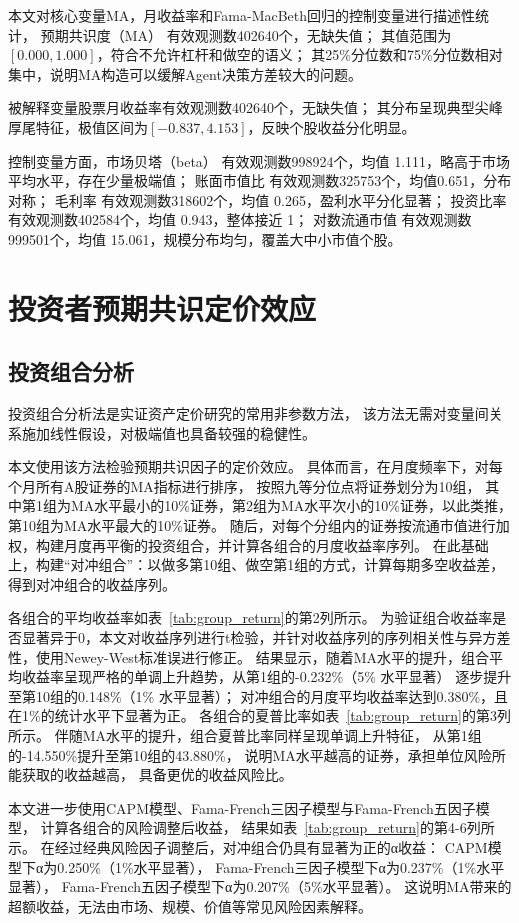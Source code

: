 本文对核心变量MA，月收益率和Fama-MacBeth回归的控制变量进行描述性统计，
预期共识度（MA） 有效观测数402640个，无缺失值；
其值范围为$[0.000, 1.000]$，符合不允许杠杆和做空的语义；
其25\%分位数和75\%分位数相对集中，说明MA构造可以缓解Agent决策方差较大的问题。

被解释变量股票月收益率有效观测数402640个，无缺失值；
其分布呈现典型尖峰厚尾特征，极值区间为$[-0.837, 4.153]$，反映个股收益分化明显。

控制变量方面，市场贝塔（beta） 有效观测数998924个，均值 1.111，略高于市场平均水平，存在少量极端值；
账面市值比 有效观测数325753个，均值0.651，分布对称；
毛利率 有效观测数318602个，均值 0.265，盈利水平分化显著；
投资比率 有效观测数402584个，均值 0.943，整体接近 1；
对数流通市值 有效观测数999501个，均值 15.061，规模分布均匀，覆盖大中小市值个股。

\section{投资者预期共识定价效应}

\subsection{投资组合分析}
投资组合分析法是实证资产定价研究的常用非参数方法，
该方法无需对变量间关系施加线性假设，对极端值也具备较强的稳健性。

本文使用该方法检验预期共识因子的定价效应。
具体而言，在月度频率下，对每个月所有A股证券的MA指标进行排序，
按照九等分位点将证券划分为10组，
其中第1组为MA水平最小的10\%证券，第2组为MA水平次小的10\%证券，以此类推，第10组为MA水平最大的10\%证券。
随后，对每个分组内的证券按流通市值进行加权，构建月度再平衡的投资组合，并计算各组合的月度收益率序列。
在此基础上，构建“对冲组合”：以做多第10组、做空第1组的方式，计算每期多空收益差，得到对冲组合的收益序列。

各组合的平均收益率如表~\ref{tab:group_return}的第2列所示。
为验证组合收益率是否显著异于0，本文对收益序列进行t检验，并针对收益序列的序列相关性与异方差性，使用Newey-West标准误进行修正。
结果显示，随着MA水平的提升，组合平均收益率呈现严格的单调上升趋势，从第1组的-0.232\%（5\% 水平显著）
逐步提升至第10组的0.148\%（1\% 水平显著）；
对冲组合的月度平均收益率达到0.380\%，且在1\%的统计水平下显著为正。
各组合的夏普比率如表~\ref{tab:group_return}的第3列所示。
伴随MA水平的提升，组合夏普比率同样呈现单调上升特征，
从第1组的-14.550\%提升至第10组的43.880\%，
说明MA水平越高的证券，承担单位风险所能获取的收益越高，
具备更优的收益风险比。

本文进一步使用CAPM模型、Fama-French三因子模型与Fama-French五因子模型，
计算各组合的风险调整后收益，
结果如表~\ref{tab:group_return}的第4-6列所示。
在经过经典风险因子调整后，对冲组合仍具有显著为正的α收益：
CAPM模型下α为0.250\%（1\%水平显著），
Fama-French三因子模型下α为0.237\%（1\%水平显著），
Fama-French五因子模型下α为0.207\%（5\%水平显著）。
这说明MA带来的超额收益，无法由市场、规模、价值等常见风险因素解释。

